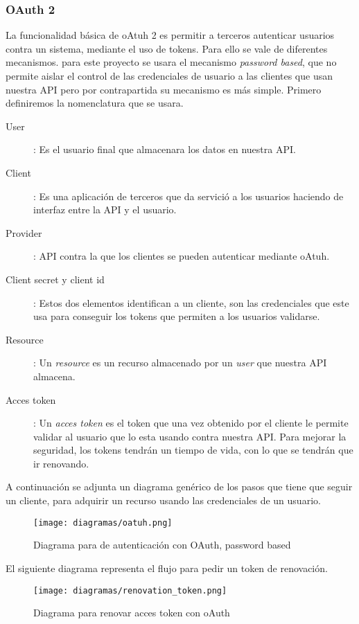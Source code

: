 \subsubsection{OAuth 2}
\label{sec:oauth2}
La funcionalidad básica de oAtuh 2 es permitir a terceros autenticar usuarios contra un sistema, mediante el uso de tokens. Para ello se vale de diferentes mecanismos. para este proyecto se usara el mecanismo \textit{password based}, que no permite aislar el control de las credenciales de usuario a las clientes que usan nuestra API pero por contrapartida su mecanismo es más simple.
Primero definiremos la nomenclatura que se usara.
\begin{description}
\item[User]: Es el usuario final que almacenara los datos en nuestra API.
\item[Client]: Es una aplicación de terceros que da servició a los usuarios haciendo de interfaz entre la API y el usuario.
\item[Provider]: API contra la que los clientes se pueden autenticar mediante oAtuh.
\item[Client secret y client id]: Estos dos elementos identifican a un cliente, son las credenciales que este usa para conseguir los tokens que permiten a los usuarios validarse.
\item[Resource]: Un \textit{resource} es un recurso almacenado por un \textit{user} que nuestra API almacena.
\item[Acces token]: Un \textit{acces token} es el token que una vez obtenido por el cliente le permite validar al usuario que lo esta usando contra nuestra API. Para mejorar la seguridad, los tokens tendrán un tiempo de vida, con lo que se tendrán que ir renovando.
\end{description}
A continuación se adjunta un diagrama genérico de los pasos que tiene que seguir un cliente, para adquirir un recurso usando las credenciales de un usuario.

\begin{figure}[ht!]
\center
\texttt{[image: diagramas/oatuh.png]}
\caption{Diagrama para de autenticación con OAuth, password based}
\label{fig:auth_sequence1}
\end{figure}

El siguiente diagrama representa el flujo para pedir un token de renovación.
\begin{figure}[ht!]
\center
\texttt{[image: diagramas/renovation\_token.png]}
\caption{Diagrama para renovar acces token con oAuth}
\label{fig:auth_sequence2}
\end{figure}
\newpage

